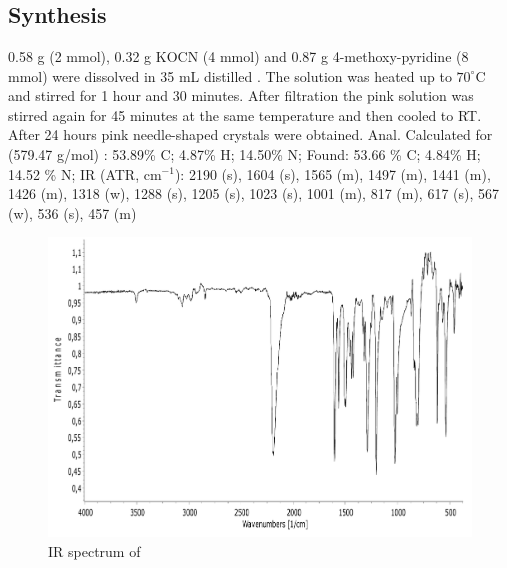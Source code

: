 \section{}
\subsection{Synthesis}
0.58 g  (2 mmol), 0.32 g KOCN (4 mmol) and 0.87 g 4-methoxy-pyridine (8 mmol) were dissolved in 35 mL distilled . The solution was heated up to $70^\circ$C  and stirred for 1 hour and 30 minutes. After filtration the pink solution was stirred again for 45 minutes at the same temperature and then cooled to RT. After 24 hours pink needle-shaped crystals were obtained. Anal. Calculated for  (579.47 g/mol) : 53.89\% C; 4.87\% H; 14.50\% N;
Found: 53.66 \% C; 4.84\% H; 14.52 \% N;
IR (ATR, cm$^{-1}$): 2190 (s), 1604 (s), 1565 (m), 1497 (m), 1441 (m), 1426 (m), 1318 (w), 1288 (s), 1205 (s), 1023 (s), 1001 (m), 817 (m), 617 (s), 567 (w), 536 (s), 457 (m)

\begin{figure}[h!]
\centering
\includegraphics[width=1\textwidth]{figures/CoO4MOP-IR.pdf}
\caption{IR spectrum of }
\end{figure}




